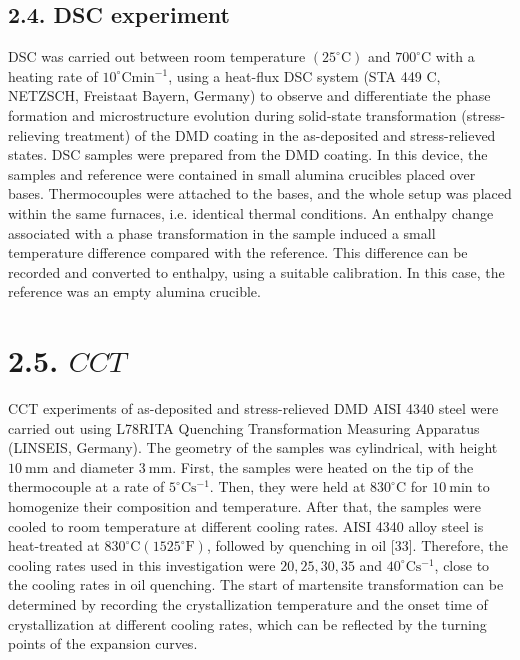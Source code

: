\documentclass[10pt]{article}
\begin{document}
\subsection*{2.4. DSC experiment}
DSC was carried out between room temperature $\left(25^{\circ} \mathrm{C}\right)$ and $700^{\circ} \mathrm{C}$ with a heating rate of $10^{\circ} \mathrm{C} \mathrm{min}^{-1}$, using a heat-flux DSC system (STA 449 C, NETZSCH, Freistaat Bayern, Germany) to observe and differentiate the phase formation and microstructure evolution during solid-state transformation (stress-relieving treatment) of the DMD coating in the as-deposited and stress-relieved states. DSC samples were prepared from the DMD coating. In this device, the samples and reference were contained in small alumina crucibles placed over bases. Thermocouples were attached to the bases, and the whole setup was placed within the same furnaces, i.e. identical thermal conditions. An enthalpy change associated with a phase transformation in the sample induced a small temperature difference compared with the reference. This difference can be recorded and converted to enthalpy, using a suitable calibration. In this case, the reference was an empty alumina crucible.

\section*{2.5. $C C T$}
CCT experiments of as-deposited and stress-relieved DMD AISI 4340 steel were carried out using L78RITA Quenching Transformation Measuring Apparatus (LINSEIS, Germany). The geometry of the samples was cylindrical, with height $10 \mathrm{~mm}$ and diameter $3 \mathrm{~mm}$. First, the samples were heated on the tip of the thermocouple at a rate of $5^{\circ} \mathrm{C} \mathrm{s}^{-1}$. Then, they were held at $830^{\circ} \mathrm{C}$ for $10 \mathrm{~min}$ to homogenize their composition and temperature. After that, the samples were cooled to room temperature at different cooling rates. AISI 4340 alloy steel is heat-treated at $830^{\circ} \mathrm{C}\left(1525^{\circ} \mathrm{F}\right)$, followed by quenching in oil [33]. Therefore, the cooling rates used in this investigation were $20,25,30,35$ and $40^{\circ} \mathrm{C} \mathrm{s}^{-1}$, close to the cooling rates in oil quenching. The start of martensite transformation can be determined by recording the crystallization temperature and the onset time of crystallization at different cooling rates, which can be reflected by the turning points of the expansion curves.
\end{document}

